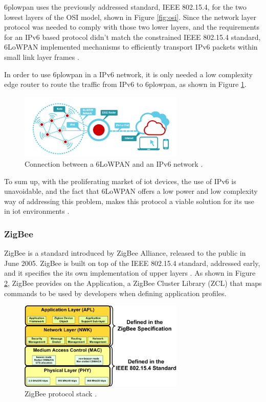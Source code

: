 \ac{6plowpan} uses the previously addressed standard, IEEE 802.15.4, for the two lowest layers of the OSI model, shown in Figure \ref{fig:osi}. Since the network layer protocol was needed to comply with those two lower layers, and the requirements for an IPv6 based protocol didn't match the constrained IEEE 802.15.4 standard, 6LoWPAN implemented mechanisms to efficiently transport IPv6 packets within small link layer frames \cite{chalappuram2016}. 

In order to use \ac{6plowpan} in a IPv6 network, it is only needed a low complexity edge router to route the traffic from IPv6 to \ac{6plowpan}, as shown in Figure \ref{fig:6low}. 

\begin{figure}[H]
	\centering
	\includegraphics[width=0.7\textwidth]{figures/edge.png}
	\caption{Connection between a 6LoWPAN and an IPv6 network \cite{6low}.}
	\label{fig:6low}
\end{figure}


To sum up, with the proliferating market of \ac{iot} devices, the use of IPv6 is unavoidable, and the fact that 6LoWPAN offers a low power and low complexity way of addressing this problem, makes this protocol a viable solution for its use in \ac{iot} environments \cite{Mehboob2016}.  


\subsubsection{ZigBee}
ZigBee is a standard introduced by ZigBee Alliance, released to the public in June 2005. ZigBee is built on top of the IEEE 802.15.4 standard, addressed early, and it specifies the its own implementation of upper layers \cite{INSTEON2013}. As shown in Figure \ref{fig:zig}, ZigBee provides on the Application, a ZigBee Cluster Library (ZCL) that maps commands to be used by developers when defining application profiles.


\begin{figure}[H]
	\centering
	\includegraphics[width=0.7\textwidth]{figures/zig.jpg}
	\caption{ZigBee protocol stack \cite{article}.}
	\label{fig:zig}
\end{figure}


